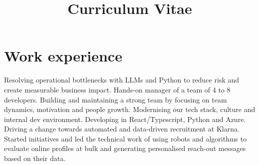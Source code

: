 \documentclass[11pt,a4paper,sans]{moderncv}
\title{Curriculum Vitae}
\begin{document}
\makecvtitle

\section{Work experience}\label{sec:work-experience}
{Resolving operational bottlenecks with LLMs and Python to reduce
risk and create measurable business impact.}
{Hands-on manager of a team of 4 to 8 developers.
Building and maintaining a strong team by focusing on team dynamics, motivation and people growth.
Modernising our tech stack, culture and internal dev environment.
Developing in React/Typescript, Python and Azure.}
{Driving a change towards automated and data-driven recruitment at Klarna.
Started initiatives and led the technical work of using robots and algorithms to evaluate
online profiles at bulk and generating personalised reach-out messages based on their data.
}
\end{document}
